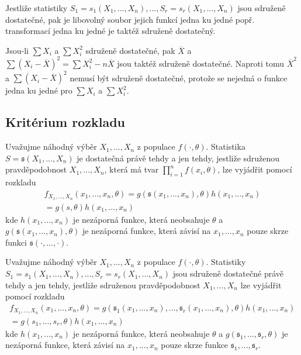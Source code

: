 \begin{definition}
Jestliže statistiky $S_1 = \mathit{s_1}(X_1, ..., X_n), ..., S_r = \mathit{s_r}(X_1, ..., X_n)$ jsou sdruženě dostatečné, pak je libovolný soubor jejich funkcí jedna ku jedné popř. transformací jedna ku jedné je taktéž sdruženě dostatečný.
\end{definition}

\begin{example}
Jsou-li $\sum X_i$ a $\sum X_i^2$ sdruženě dostatečné, pak $\overline{X}$ a $\sum (X_i - \overline{X})^2 = \sum X_i^2 - n\overline{X}$ jsou taktéž sdruženě dostatečné. Naproti tomu $\overline{X}^2$ a $\sum(X_i - \overline{X})^2$ nemusí být sdruženě dostatečné, protože se nejedná o funkce jedna ku jedné pro $\sum X_i$ a $\sum X_i^2$.
\end{example}

\subsection{Kritérium rozkladu}

\begin{theorem}
Uvažujme náhodný výběr $X_1, ..., X_n$ z populace $f(\cdot, \theta)$. Statistika $S = \mathfrak{s}(X_1, ..., X_n)$ je dostatečná právě tehdy a jen tehdy, jestliže sdruženou pravděpodobnost $X_1, ..., X_n$, která má tvar $\prod_{i = 1}^n f(x_i, \theta)$, lze vyjádřit pomocí rozkladu
\begin{gather*}
f_{X_1, ..., X_n}(x_1, ..., x_n, \theta) = g(\mathfrak{s}(x_1,..., x_n), \theta)h(x_1, ..., x_n)\\
= g(s, \theta)h(x_1, ..., x_n)
\end{gather*}
kde $h(x_1, ..., x_n)$ je nezáporná funkce, která neobsahuje $\theta$ a $g(\mathfrak{s}(x_1, ..., x_n), \theta)$ je nezáporná funkce, která závisí na $x_1, ..., x_n$ pouze skrze funkci $\mathfrak{s}(\cdot, ..., \cdot)$. 
\end{theorem}

\begin{theorem}
Uvažujme náhodný výběr $X_1, ..., X_n$ z populace $f(\cdot, \theta)$. Statistiky $S_1 = \mathit{s_1}(X_1, ..., X_n), ..., S_r = \mathit{s_r}(X_1, ..., X_n)$ jsou sdruženě dostatečné právě tehdy a jen tehdy, jestliže sdruženou pravděpodobnost $X_1, ..., X_n$ lze vyjádřit pomocí rozkladu
\begin{gather*}
f_{X_1, ..., X_n}(x_1, ..., x_n, \theta) = g(\mathfrak{s}_1(x_1,..., x_n), ..., \mathfrak{s}_r(x_1, ..., x_n), \theta)h(x_1, ..., x_n)\\
= g(s_1, ..., s_r, \theta)h(x_1, ..., x_n)
\end{gather*}
kde $h(x_1, ..., x_n)$ je nezáporná funkce, která neobsahuje $\theta$ a $g(\mathfrak{s}_1, ..., \mathfrak{s}_r, \theta)$ je nezáporná funkce, která závisí na $x_1, ..., x_n$ pouze skrze funkce $\mathfrak{s}_1, ..., \mathfrak{s}_r$.
\end{theorem}

